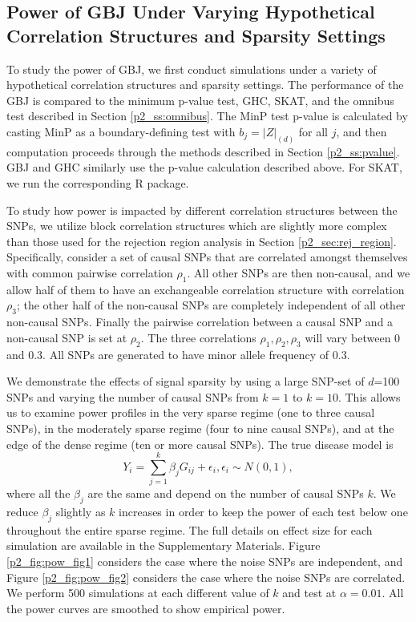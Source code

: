 \documentclass[12pt]{article}
\begin{document}
\subsection{Power of GBJ Under Varying Hypothetical Correlation Structures and Sparsity Settings}
\label{p2_ss:structured_power}

To study the power of GBJ, we first conduct simulations under a variety
of hypothetical correlation structures and sparsity settings. 
The performance of the GBJ is compared to the minimum p-value test, GHC, SKAT, 
and the omnibus test described in Section \ref{p2_ss:omnibus}. 
The MinP test p-value is calculated by casting MinP as a boundary-defining test 
with $b_{j}=|Z|_{(d)}$ for all $j$, and then computation proceeds through
the methods described in Section \ref{p2_ss:pvalue}.
GBJ and GHC similarly use the p-value calculation described above.
For SKAT, we run the corresponding R package. 


To study how power is impacted by different correlation structures between the SNPs, 
we utilize block correlation structures which are slightly more complex than those 
used for the rejection region analysis in Section \ref{p2_sec:rej_region}. 
Specifically, consider a set of causal SNPs that are correlated amongst themselves 
with common pairwise correlation $\rho_{1}$.
All other SNPs are then non-causal, and we allow half of them to have an exchangeable
correlation structure with correlation $\rho_{3}$; the other half of the non-causal SNPs 
are completely independent of all other non-causal SNPs. 
Finally the pairwise correlation between a causal SNP and a non-causal SNP is set at $\rho_{2}$.
The three correlations $\rho_{1},\rho_{2},\rho_{3}$ will vary between 0 and 0.3.  
All SNPs are generated to have minor allele frequency of 0.3.


We demonstrate the effects of signal sparsity by using a large SNP-set of $d$=100 SNPs
and varying the number of causal SNPs from $k=1$ to $k=10$. 
This allows us to examine power profiles in the very sparse regime (one to three causal SNPs), 
in the moderately sparse regime (four to nine causal SNPs), and at the edge of the dense regime
(ten or more causal SNPs). 
The true disease model is 
\begin{equation}
Y_{i}=\sum_{j=1}^{k}\beta_{j}G_{ij}+\epsilon_{i},\epsilon_{i}\sim N(0,1),
\label{p2_eq:sim_model}
\end{equation}
where all the $\beta_{j}$ are the same and depend on the number of causal SNPs $k$.
We reduce $\beta_{j}$ slightly as $k$ increases in order to keep the power of each test 
below one throughout the entire sparse regime.
The full details on effect size for each simulation are available in the Supplementary Materials.
Figure \ref{p2_fig:pow_fig1} considers the case where the noise SNPs
are independent, and Figure \ref{p2_fig:pow_fig2} considers the case where the 
noise SNPs are correlated. 
We perform 500 simulations at each different value of $k$ and test
at $\alpha=0.01$.
All the power curves are smoothed to show empirical power.
\end{document}
